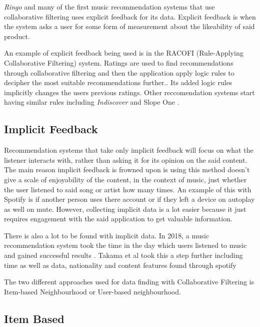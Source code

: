 \textit{Ringo} and many of the first music recommendation systems that use collaborative filtering uses explicit feedback for its data. Explicit feedback is when the system asks a user for some form of measurement about the likeability of said product. \citep{celma_recommendation_2010}

An example of explicit feedback being used is in the RACOFI (Rule-Applying Collaborative Filtering) system. Ratings are used to find recommendations through collaborative filtering and then the application apply logic rules to decipher the most suitable recommendations further.\citep{anderson_racofi_2003}. Its added logic rules implicitly changes the users previous ratings. Other reccomendation systems start having similar rules including \textit{Indiscover} and Slope One \citep{celma_music_2010} \citep{lemire_slope_2007}.

\subsection{Implicit Feedback}

Recommendation systems that take only implicit feedback will focus on what the listener interacts with, rather than asking it for its opinion on the said content. The main reason implicit feedback is frowned upon is using this method doesn't give a scale of enjoyability of the content, in the context of music, just whether the user listened to said song or artist how many times. An example of this with Spotify is if another person uses there account or if they left a device on autoplay as well on mute. However, collecting implicit data is a lot easier because it just requires engagement with the said application to get valuable information. 

There is also a lot to be found with implicit data. In 2018, a music recommendation system took the time in the day which users listened to music and gained successful results \citep{sanchez-moreno_incorporating_2018}. Takama et al took this a step further including time as well as data, nationality and content features found through spotify \citep{takama_context-aware_2021} 

The two different approaches used for data finding with Collaborative Filtering is Item-based Neighbourhood or User-based neighbourhood. 

\subsection{Item Based}

